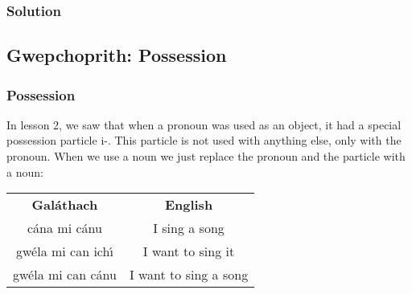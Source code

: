 \newpage
\subsubsection{Solution}

\begin{table}[H]
\centering
{}
\label{solution_no_indefinite_article}
\caption{Solution: no indefinite article}
\end{table}
\newpage

\subsection{Gwepchoprith: Possession}
\subsubsection{Possession}

In lesson 2, we saw that when a pronoun was used as an object, it had a special possession particle i-. This particle is not used with anything else, only with the pronoun. When we use a noun we just replace the pronoun and the particle with a noun:

\begin{table}[H]
\centering
\begin{tabular}{cc}
  \toprule
  \textbf{Gal\'{a}thach} & \textbf{English}\\
  \cmidrule(lr){1-1}\cmidrule(lr){2-2}
  c\'{a}na mi c\'{a}nu & I sing a song\\
  gw\'{e}la mi can ich\'{\i} & I want to sing it\\
  gw\'{e}la mi can c\'{a}nu & I want to sing a song\\
  \bottomrule
\end{tabular}
\label{examples_possession_particle_when_using_noun}
\end{table}

